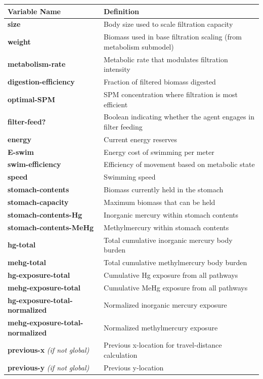 \documentclass[
]{book}
\begin{document}
\begin{longtable}[]{@{}
  >{\raggedright\arraybackslash}p{}
  >{\raggedright\arraybackslash}p{}@{}}
\toprule\noalign{}
\begin{minipage}[b]{\linewidth}\raggedright
Variable Name
\end{minipage} & \begin{minipage}[b]{\linewidth}\raggedright
Definition
\end{minipage} \\
\midrule\noalign{}
\endhead
\bottomrule\noalign{}
\endlastfoot
\textbf{size} & Body size used to scale filtration capacity \\
\textbf{weight} & Biomass used in base filtration scaling (from metabolism submodel) \\
\textbf{metabolism-rate} & Metabolic rate that modulates filtration intensity \\
\textbf{digestion-efficiency} & Fraction of filtered biomass digested \\
\textbf{optimal-SPM} & SPM concentration where filtration is most efficient \\
\textbf{filter-feed?} & Boolean indicating whether the agent engages in filter feeding \\
\textbf{energy} & Current energy reserves \\
\textbf{E-swim} & Energy cost of swimming per meter \\
\textbf{swim-efficiency} & Efficiency of movement based on metabolic state \\
\textbf{speed} & Swimming speed \\
\textbf{stomach-contents} & Biomass currently held in the stomach \\
\textbf{stomach-capacity} & Maximum biomass that can be held \\
\textbf{stomach-contents-Hg} & Inorganic mercury within stomach contents \\
\textbf{stomach-contents-MeHg} & Methylmercury within stomach contents \\
\textbf{hg-total} & Total cumulative inorganic mercury body burden \\
\textbf{mehg-total} & Total cumulative methylmercury body burden \\
\textbf{hg-exposure-total} & Cumulative Hg exposure from all pathways \\
\textbf{mehg-exposure-total} & Cumulative MeHg exposure from all pathways \\
\textbf{hg-exposure-total-normalized} & Normalized inorganic mercury exposure \\
\textbf{mehg-exposure-total-normalized} & Normalized methylmercury exposure \\
\textbf{previous-x} \emph{(if not global)} & Previous x-location for travel-distance calculation \\
\textbf{previous-y} \emph{(if not global)} & Previous y-location \\
\end{longtable}
\end{document}
